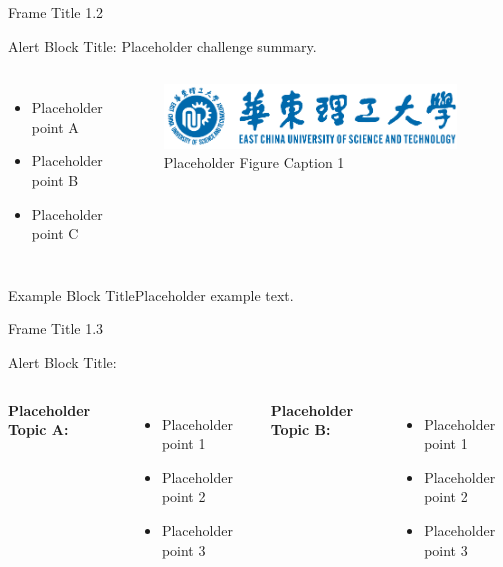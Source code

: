 \documentclass{beamer}
\begin{document}
\begin{frame}{Frame Title 1.2} %
\begin{alertblock}{Alert Block Title:} Placeholder challenge summary.\end{alertblock}
    \begin{columns}[T]
        \begin{itemize}
        	\item Placeholder point A
            \item Placeholder point B
            \item Placeholder point C
        \end{itemize}

        \begin{figure}
            \centering
            \includegraphics[width=0.95\textwidth]{images/logo.pdf} %
            \caption{Placeholder Figure Caption 1}
        \end{figure}
    \end{columns}
    \vspace{-1em}
    \begin{exampleblock}{\small Example Block Title}\scriptsize Placeholder example text.\end{exampleblock}
\end{frame}

\begin{frame}{Frame Title 1.3} %
\begin{alertblock}{Alert Block Title:}
    \vspace{1em}
    \begin{columns}
			\textbf{Placeholder Topic A:}
            \begin{itemize}
                \item Placeholder point 1
                \item Placeholder point 2
                \item Placeholder point 3
            \end{itemize}
			\textbf{Placeholder Topic B:}
            \begin{itemize}
                \item Placeholder point 1
                \item Placeholder point 2
                \item Placeholder point 3
            \end{itemize}
	\end{columns}
\end{alertblock}
\end{frame}
\end{document}
